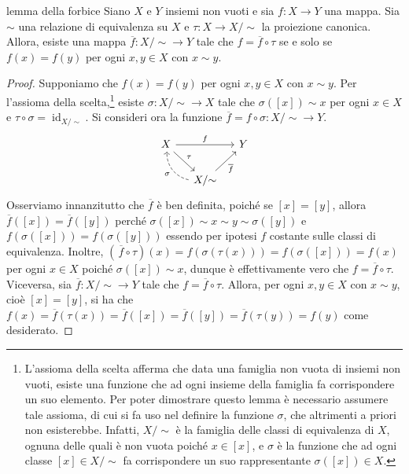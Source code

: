 \begin{lem}{lemma della forbice}
  Siano $X$ e $Y$ insiemi non vuoti e sia $f\colon X\to Y$ una mappa. Sia $\sim$ una relazione di equivalenza su $X$ e $\tau\colon X\to X/{\sim}$ 
  la proiezione canonica\footnotemark. Allora, esiste una mappa $\overline{f}\colon X/{\sim}\to Y$ tale che 
  $f=\overline{f}\circ \tau$ se e solo se $f(x)=f(y)$ per ogni $x,y\in X$ con $x\sim y$.
\end{lem}
\vspace{-4mm}
\begin{proof}
  Supponiamo che $f(x)=f(y)$ per ogni $x,y\in X$ con $x\sim y$. Per l'assioma della scelta,\footnote{L'assioma della scelta afferma che data 
  una famiglia non vuota di insiemi non vuoti, esiste una funzione che ad ogni insieme della famiglia fa corrispondere un suo elemento. 
  Per poter dimostrare questo lemma è necessario assumere tale assioma, di cui si fa uso nel definire la funzione $\sigma$, 
  che altrimenti a priori non esisterebbe. Infatti, $X/{\sim}$ è la famiglia delle classi di equivalenza di $X$, 
  ognuna delle quali è non vuota poiché $x\in [x]$, e $\sigma$ è la funzione che ad ogni classe $[x]\in X/{\sim}$ 
  fa corrispondere un suo rappresentante $\sigma([x])\in X$.} esiste $\sigma\colon X/{\sim}\to X$ tale che $\sigma([x])\sim x$ 
  per ogni $x\in X$ e $\tau \circ \sigma = \operatorname{id}_{X/{\sim}}$. Si consideri ora la funzione $\overline{f}=f\circ \sigma \colon X/{\sim}\to Y$.
  \[
    \begin{tikzcd}[column sep=small]
  X \arrow[rd, "\tau"] \arrow[rr, "f"] &                                                                               & Y \\
                                      & X/{\sim} \arrow[ru, "\overline{f}"'] \arrow[lu, "\sigma", dashed, bend left=40] &  
  \end{tikzcd}
  \]
  Osserviamo innanzitutto che $\overline{f}$ è ben definita, poiché se $[x]=[y]$, 
  allora $\overline{f}([x])=\overline{f}([y])$ perché $\sigma([x])\sim x\sim y\sim \sigma([y])$ e $f(\sigma([x]))=f(\sigma([y]))$ 
  essendo per ipotesi $f$ costante sulle classi di equivalenza. Inoltre, 
  $\left(\,\overline{f}\circ \tau\right) (x)=f(\sigma(\tau(x)))=f(\sigma([x]))=f(x)$ per ogni $x\in X$ poiché $\sigma([x])\sim x$, 
  dunque è effettivamente vero che $f=\overline{f}\circ \tau$.
  \vspace{1.5mm}
  \noindent Viceversa, sia $\overline{f}\colon X/{\sim}\to Y$ tale che $f=\overline{f}\circ \tau$. 
  Allora, per ogni $x,y \in X$ con $x\sim y$, cioè $[x]=[y]$, si ha che 
  $f(x)=\overline{f}(\tau(x))=\overline{f}([x])=\overline{f}([y])=\overline{f}(\tau(y))=f(y)$ come desiderato.
\end{proof}

